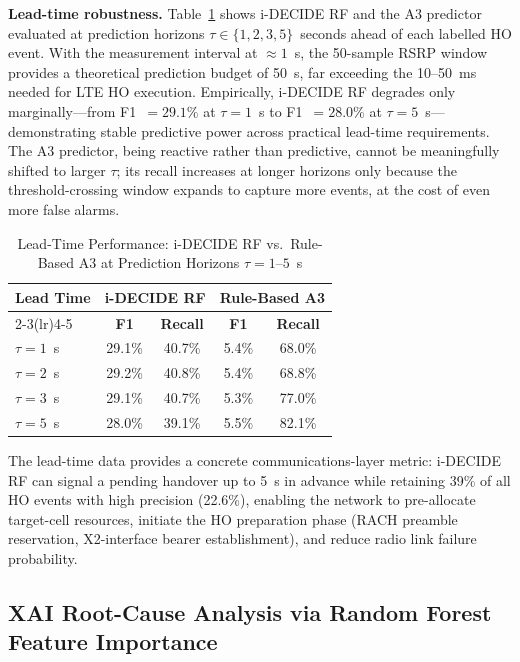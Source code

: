 \documentclass[journal]{IEEEtran}
\begin{document}
\textbf{Lead-time robustness.}
Table~\ref{tab:leadtime} shows i-DECIDE RF and the A3 predictor
evaluated at prediction horizons $\tau \in \{1,2,3,5\}$~seconds ahead
of each labelled HO event. With the measurement interval at
$\approx 1$~s, the 50-sample RSRP window provides a theoretical
prediction budget of \SI{50}{\second}, far exceeding the 10--50~ms
needed for LTE HO execution. Empirically, i-DECIDE RF degrades only
marginally---from F1~$= 29.1\%$ at $\tau=1$~s to F1~$= 28.0\%$ at
$\tau=5$~s---demonstrating stable predictive power across practical
lead-time requirements. The A3 predictor, being reactive rather than
predictive, cannot be meaningfully shifted to larger $\tau$; its recall
increases at longer horizons only because the threshold-crossing window
expands to capture more events, at the cost of even more false alarms.

\begin{table}[!t]
\caption{Lead-Time Performance: i-DECIDE RF vs.\ Rule-Based A3
at Prediction Horizons $\tau = 1$--$5$~s}
\label{tab:leadtime}
\centering
\renewcommand{\arraystretch}{1.15}
\begin{tabular}{lcccc}
\toprule
\multirow{2}{*}{\textbf{Lead Time}} &
  \multicolumn{2}{c}{\textbf{i-DECIDE RF}} &
  \multicolumn{2}{c}{\textbf{Rule-Based A3}} \\
\cmidrule(lr){2-3}\cmidrule(lr){4-5}
 & \textbf{F1} & \textbf{Recall} & \textbf{F1} & \textbf{Recall} \\
\midrule
$\tau = 1$~s & 29.1\% & 40.7\% & 5.4\% & 68.0\% \\
$\tau = 2$~s & 29.2\% & 40.8\% & 5.4\% & 68.8\% \\
$\tau = 3$~s & 29.1\% & 40.7\% & 5.3\% & 77.0\% \\
$\tau = 5$~s & 28.0\% & 39.1\% & 5.5\% & 82.1\% \\
\bottomrule
\end{tabular}
\end{table}

The lead-time data provides a concrete communications-layer metric:
i-DECIDE RF can signal a pending handover up to \SI{5}{\second} in
advance while retaining 39\% of all HO events with high precision
(22.6\%), enabling the network to pre-allocate target-cell resources,
initiate the HO preparation phase (RACH preamble reservation,
X2-interface bearer establishment), and reduce radio link failure
probability.

\subsection{XAI Root-Cause Analysis via Random Forest Feature Importance}
\end{document}
